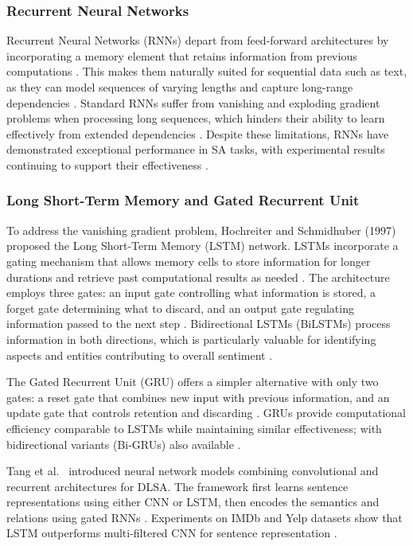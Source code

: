\documentclass[a4paper,twoside,12pt]{book}
\begin{document}
\subsubsection{Recurrent Neural Networks}
Recurrent Neural Networks (RNNs) depart from feed-forward architectures by incorporating a memory element that retains information from previous computations \cite{sharma2025review}. This makes them naturally suited for sequential data such as text, as they can model sequences of varying lengths and capture long-range dependencies \cite{sharma2025review}. Standard RNNs suffer from vanishing and exploding gradient problems when processing long sequences, which hinders their ability to learn effectively from extended dependencies \cite{sharma2025review}. Despite these limitations, RNNs have demonstrated exceptional performance in SA tasks, with experimental results continuing to support their effectiveness \cite{sharma2025review}.

\subsubsection{Long Short-Term Memory and Gated Recurrent Unit}

To address the vanishing gradient problem, Hochreiter and Schmidhuber (1997) \cite{hochreiter1997long} proposed the Long Short-Term Memory (LSTM) network. LSTMs incorporate a gating mechanism that allows memory cells to store information for longer durations and retrieve past computational results as needed \cite{hochreiter1997long}. The architecture employs three gates: an input gate controlling what information is stored, a forget gate determining what to discard, and an output gate regulating information passed to the next step \cite{hochreiter1997long}. Bidirectional LSTMs (BiLSTMs) process information in both directions, which is particularly valuable for identifying aspects and entities contributing to overall sentiment \cite{sharma2025review}.

The Gated Recurrent Unit (GRU) offers a simpler alternative with only two gates: a reset gate that combines new input with previous information, and an update gate that controls retention and discarding \cite{cho2014learning}. GRUs provide computational efficiency comparable to LSTMs while maintaining similar effectiveness; with bidirectional variants (Bi-GRUs) also available \cite{sharma2025review}.

Tang et al.~\cite{Tang2015document} introduced neural network models combining convolutional and recurrent architectures for DLSA. The framework first learns sentence representations using either CNN or LSTM, then encodes the semantics and relations using gated RNNs \cite{Tang2015document}. Experiments on IMDb and Yelp datasets show that LSTM outperforms multi-filtered CNN for sentence representation \cite{Tang2015document}.
\end{document}
